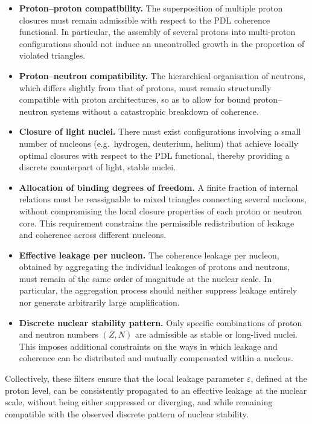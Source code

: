 \documentclass[11pt,a4paper]{article}
\theoremstyle{definition}
\begin{document}
\begin{itemize}
  \item[(II1)] \textbf{Proton–proton compatibility.} The superposition of multiple proton closures must remain admissible with respect to the PDL coherence functional. In particular, the assembly of several protons into multi-proton configurations should not induce an uncontrolled growth in the proportion of violated triangles.\cite{Combinatorial_Proton_v2_2026,PDL_Global_Mapping_2026}
  \item[(II2)] \textbf{Proton–neutron compatibility.} The hierarchical organisation of neutrons, which differs slightly from that of protons, must remain structurally compatible with proton architectures, so as to allow for bound proton–neutron systems without a catastrophic breakdown of coherence.\cite{Exponent_18_PDL_2026}
  \item[(II3)] \textbf{Closure of light nuclei.} There must exist configurations involving a small number of nucleons (e.g.\ hydrogen, deuterium, helium) that achieve locally optimal closures with respect to the PDL functional, thereby providing a discrete counterpart of light, stable nuclei.\cite{PDL_Global_Mapping_2026}
  \item[(II4)] \textbf{Allocation of binding degrees of freedom.} A finite fraction of internal relations must be reassignable to mixed triangles connecting several nucleons, without compromising the local closure properties of each proton or neutron core. This requirement constrains the permissible redistribution of leakage and coherence across different nucleons.\cite{Exponent_18_PDL_2026}
  \item[(II5)] \textbf{Effective leakage per nucleon.} The coherence leakage per nucleon, obtained by aggregating the individual leakages of protons and neutrons, must remain of the same order of magnitude at the nuclear scale. In particular, the aggregation process should neither suppress leakage entirely nor generate arbitrarily large amplification.\cite{Exponent_18_PDL_2026,Topological_Reformulation_PDL_2026}
  \item[(II6)] \textbf{Discrete nuclear stability pattern.} Only specific combinations of proton and neutron numbers $(Z,N)$ are admissible as stable or long-lived nuclei. This imposes additional constraints on the ways in which leakage and coherence can be distributed and mutually compensated within a nucleus.\cite{PDL_Global_Mapping_2026}
\end{itemize}

Collectively, these filters ensure that the local leakage parameter $\varepsilon$, defined at the proton level, can be consistently propagated to an effective leakage at the nuclear scale, without being either suppressed or diverging, and while remaining compatible with the observed discrete pattern of nuclear stability.\cite{Exponent_18_PDL_2026}
\end{document}

